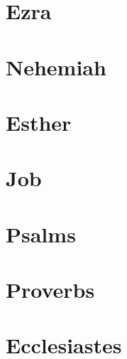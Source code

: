 \chapter{Ezra}
\begin{multicols}{2}
  \raggedcolumns
  \parskip=0pt \relax
  
\end{multicols}

\chapter{Nehemiah}
\begin{multicols}{2}
  \raggedcolumns
  \parskip=0pt \relax
  
\end{multicols}

\chapter{Esther}
\begin{multicols}{2}
  \raggedcolumns
  \parskip=0pt \relax
  
\end{multicols}

\chapter{Job}
\begin{multicols}{2}
  \raggedcolumns
  \parskip=0pt \relax
  
\end{multicols}

\chapter{Psalms}
\begin{multicols}{2}
  \raggedcolumns
  \parskip=0pt \relax
  
\end{multicols}

\chapter{Proverbs}
\begin{multicols}{2}
  \raggedcolumns
  \parskip=0pt \relax
  
\end{multicols}

\chapter{Ecclesiastes}
\begin{multicols}{2}
  \raggedcolumns
  \parskip=0pt \relax
  
\end{multicols}

